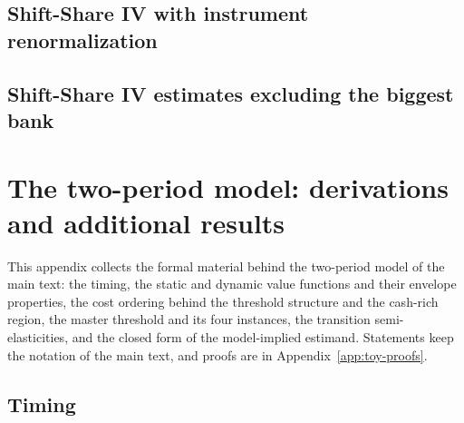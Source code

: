 \documentclass[12pt]{article}
\begin{document}
\subsection{Shift-Share IV with instrument renormalization} \label{renormalized}

\begin{table}[H]
    \caption{Robustness to instrument renormalization}
    \label{renormalized_table}
    \centering
    \small
    
\end{table}

\subsection{Shift-Share IV estimates excluding the biggest bank} \label{drop_top_bank_section}

\begin{table}[H]
    \caption{Shift-Share IV estimates excluding the biggest bank}
    \label{drop_top_bank_table}
    \centering
    \small
    
\end{table}

\section{The two-period model: derivations and additional results}
\label{app:toy-details}
This appendix collects the formal material behind the two-period model of the main text: the timing, the static and dynamic value functions and their envelope properties, the cost ordering behind the threshold structure and the cash-rich region, the master threshold and its four instances, the transition semi-elasticities, and the closed form of the model-implied estimand. Statements keep the notation of the main text, and proofs are in Appendix~\ref{app:toy-proofs}.

\subsection{Timing}
\end{document}
